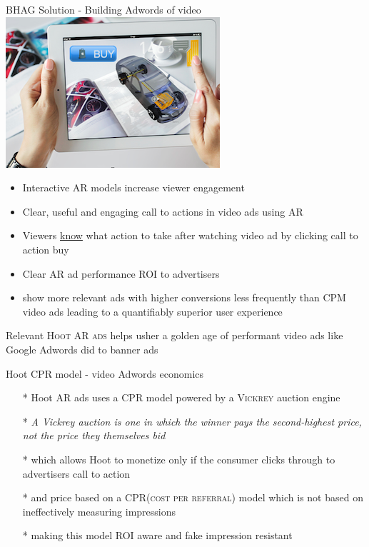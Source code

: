 \documentclass[10pt]{beamer}
\begin{document}
\begin{frame}[fragile]{BHAG Solution -  Building Adwords of video \includegraphics[scale=.1]{static/arad/arad5} }
\begin{itemize}[<+-| alert@+>]
\item Interactive AR models increase viewer engagement
\item Clear, useful and engaging call to actions in video ads using AR
\item Viewers \underline{know} what action to take after watching video ad by clicking call to action buy 
\item Clear AR ad performance \textsc{ROI} to advertisers 
\item show more relevant ads with higher conversions less frequently than CPM video ads leading to a quantifiably superior user experience 
\end{itemize}
\pause
Relevant \textsc{Hoot AR ads} helps usher a golden age of performant video ads like Google Adwords did to banner ads


\end{frame}

\begin{frame}[t]{Hoot CPR model - video Adwords economics}
\begin{itemize}[<+-| alert@+>]
\item[*] Hoot AR ads uses a CPR model powered by a \textsc{Vickrey} auction engine
\item[*]\emph{A Vickrey auction is one in which the winner pays the second-highest price, not the price they themselves bid}
\item[*]which allows Hoot to monetize only if the consumer clicks through to advertisers call to action
\item[*]and price based on a \textsc{CPR(cost per referral)} model which is not based on ineffectively measuring impressions
\item[*]making this model ROI aware and fake impression resistant
\end{itemize}
\end{frame}
\end{document}
